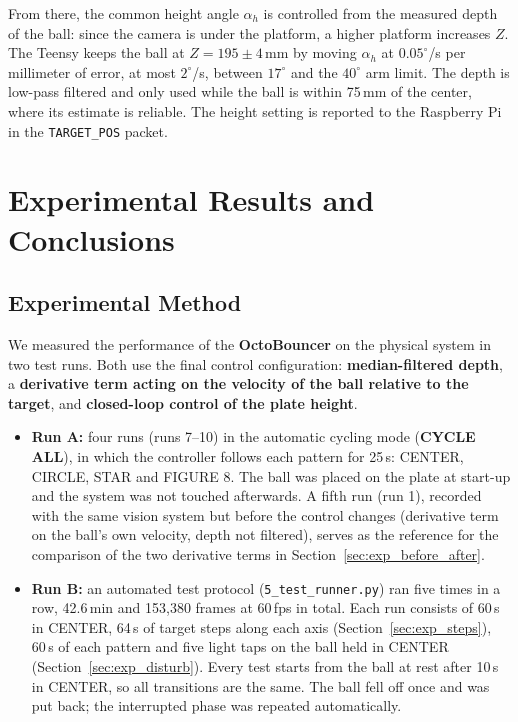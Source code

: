 \documentclass[12pt,a4paper]{report}
\begin{document}
From there, the common height angle $\alpha_h$ is controlled from the measured depth of the ball: since the camera is under the platform, a higher platform increases $Z$. The Teensy keeps the ball at $Z = 195 \pm 4$\,mm by moving $\alpha_h$ at $0.05^\circ$/s per millimeter of error, at most $2^\circ$/s, between $17^\circ$ and the $40^\circ$ arm limit. The depth is low-pass filtered and only used while the ball is within 75\,mm of the center, where its estimate is reliable. The height setting is reported to the Raspberry Pi in the \texttt{TARGET\_POS} packet.

\chapter{Experimental Results and Conclusions}
\label{chap:rezultate}

\section{Experimental Method}
\label{sec:exp_method}

We measured the performance of the \textbf{OctoBouncer} on the physical system in two test runs. Both use the final control configuration: \textbf{median-filtered depth}, a \textbf{derivative term acting on the velocity of the ball relative to the target}, and \textbf{closed-loop control of the plate height}.

\begin{itemize}
    \item \textbf{Run A:} four runs (runs 7--10) in the automatic cycling mode (\textbf{CYCLE ALL}), in which the controller follows each pattern for 25\,s: CENTER, CIRCLE, STAR and FIGURE 8. The ball was placed on the plate at start-up and the system was not touched afterwards. A fifth run (run 1), recorded with the same vision system but before the control changes (derivative term on the ball's own velocity, depth not filtered), serves as the reference for the comparison of the two derivative terms in Section~\ref{sec:exp_before_after}.
    \item \textbf{Run B:} an automated test protocol (\texttt{5\_test\_runner.py}) ran five times in a row, 42.6\,min and 153{,}380 frames at 60\,fps in total. Each run consists of 60\,s in CENTER, 64\,s of target steps along each axis (Section~\ref{sec:exp_steps}), 60\,s of each pattern and five light taps on the ball held in CENTER (Section~\ref{sec:exp_disturb}). Every test starts from the ball at rest after 10\,s in CENTER, so all transitions are the same. The ball fell off once and was put back; the interrupted phase was repeated automatically.
\end{itemize}
\end{document}
